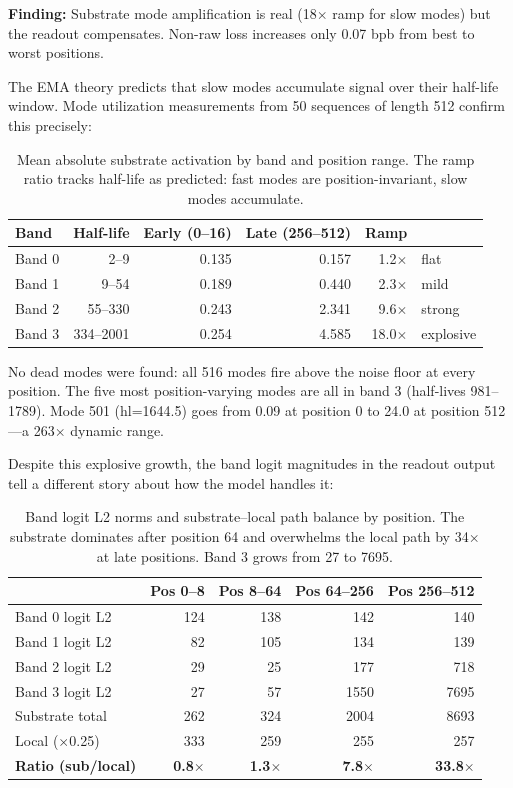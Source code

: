 \documentclass[11pt,a4paper]{report}
\newcommand{\finding}[1]{\textcolor{finding}{\textbf{Finding:}} #1}
\begin{document}
\finding{Substrate mode amplification is real (18$\times$ ramp for slow modes) but the readout compensates. Non-raw loss increases only 0.07 bpb from best to worst positions.}

The EMA theory predicts that slow modes accumulate signal over their half-life window. Mode utilization measurements from 50 sequences of length 512 confirm this precisely:

\begin{table}[h]
\centering
\begin{tabular}{lrrrrl}
\toprule
\textbf{Band} & \textbf{Half-life} & \textbf{Early (0--16)} & \textbf{Late (256--512)} & \textbf{Ramp} & \\
\midrule
Band 0 & 2--9 & 0.135 & 0.157 & 1.2$\times$ & flat \\
Band 1 & 9--54 & 0.189 & 0.440 & 2.3$\times$ & mild \\
Band 2 & 55--330 & 0.243 & 2.341 & 9.6$\times$ & strong \\
Band 3 & 334--2001 & 0.254 & 4.585 & 18.0$\times$ & explosive \\
\bottomrule
\end{tabular}
\caption{Mean absolute substrate activation by band and position range. The ramp ratio tracks half-life as predicted: fast modes are position-invariant, slow modes accumulate.}
\label{tab:mode_ramp}
\end{table}

No dead modes were found: all 516 modes fire above the noise floor at every position. The five most position-varying modes are all in band 3 (half-lives 981--1789). Mode 501 (hl=1644.5) goes from 0.09 at position 0 to 24.0 at position 512---a 263$\times$ dynamic range.

Despite this explosive growth, the band logit magnitudes in the readout output tell a different story about how the model handles it:

\begin{table}[h]
\centering
\begin{tabular}{lrrrr}
\toprule
& \textbf{Pos 0--8} & \textbf{Pos 8--64} & \textbf{Pos 64--256} & \textbf{Pos 256--512} \\
\midrule
Band 0 logit L2 & 124 & 138 & 142 & 140 \\
Band 1 logit L2 & 82 & 105 & 134 & 139 \\
Band 2 logit L2 & 29 & 25 & 177 & 718 \\
Band 3 logit L2 & 27 & 57 & 1550 & 7695 \\
\midrule
Substrate total & 262 & 324 & 2004 & 8693 \\
Local ($\times$0.25) & 333 & 259 & 255 & 257 \\
\textbf{Ratio (sub/local)} & \textbf{0.8$\times$} & \textbf{1.3$\times$} & \textbf{7.8$\times$} & \textbf{33.8$\times$} \\
\bottomrule
\end{tabular}
\caption{Band logit L2 norms and substrate--local path balance by position. The substrate dominates after position 64 and overwhelms the local path by 34$\times$ at late positions. Band 3 grows from 27 to 7695.}
\label{tab:substrate_local}
\end{table}
\end{document}
